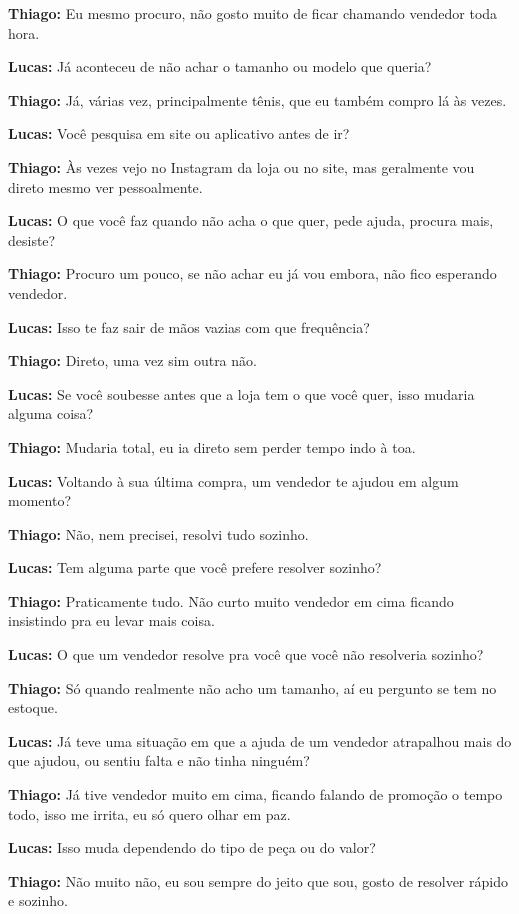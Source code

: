\textbf{Thiago:} Eu mesmo procuro, não gosto muito de ficar chamando vendedor toda hora.

\textbf{Lucas:} Já aconteceu de não achar o tamanho ou modelo que queria?

\textbf{Thiago:} Já, várias vez, principalmente tênis, que eu também compro lá às vezes.

\textbf{Lucas:} Você pesquisa em site ou aplicativo antes de ir?

\textbf{Thiago:} Às vezes vejo no Instagram da loja ou no site, mas geralmente vou direto mesmo ver pessoalmente.

\textbf{Lucas:} O que você faz quando não acha o que quer, pede ajuda, procura mais, desiste?

\textbf{Thiago:} Procuro um pouco, se não achar eu já vou embora, não fico esperando vendedor.

\textbf{Lucas:} Isso te faz sair de mãos vazias com que frequência?

\textbf{Thiago:} Direto, uma vez sim outra não.

\textbf{Lucas:} Se você soubesse antes que a loja tem o que você quer, isso mudaria alguma coisa?

\textbf{Thiago:} Mudaria total, eu ia direto sem perder tempo indo à toa.

\textbf{Lucas:} Voltando à sua última compra, um vendedor te ajudou em algum momento?

\textbf{Thiago:} Não, nem precisei, resolvi tudo sozinho.

\textbf{Lucas:} Tem alguma parte que você prefere resolver sozinho?

\textbf{Thiago:} Praticamente tudo. Não curto muito vendedor em cima ficando insistindo pra eu levar mais coisa.

\textbf{Lucas:} O que um vendedor resolve pra você que você não resolveria sozinho?

\textbf{Thiago:} Só quando realmente não acho um tamanho, aí eu pergunto se tem no estoque.

\textbf{Lucas:} Já teve uma situação em que a ajuda de um vendedor atrapalhou mais do que ajudou, ou sentiu falta e não tinha ninguém?

\textbf{Thiago:} Já tive vendedor muito em cima, ficando falando de promoção o tempo todo, isso me irrita, eu só quero olhar em paz.

\textbf{Lucas:} Isso muda dependendo do tipo de peça ou do valor?

\textbf{Thiago:} Não muito não, eu sou sempre do jeito que sou, gosto de resolver rápido e sozinho.

